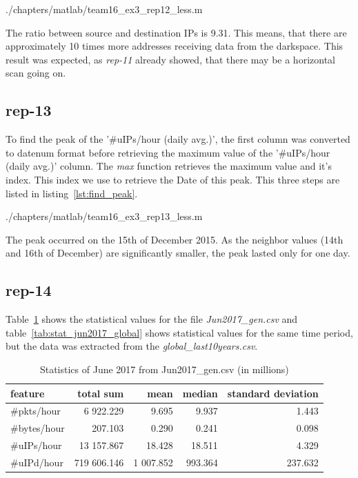 
				{./chapters/matlab/team16_ex3_rep12_less.m}


The ratio between source and destination IPs is 9.31. This means, that there are approximately 10 times more addresses receiving data from the darkspace. This result was expected, as \textit{rep-11} already showed, that there may be a horizontal scan going on.

\subsection*{rep-13}
To find the peak of the '\#uIPs/hour (daily avg.)', the first column was converted to datenum format before retrieving the maximum value of the '\#uIPs/hour (daily avg.)' column. The \textit{max} function retrieves the maximum value and it's index. This index we use to retrieve the Date of this peak. This three steps are listed in listing~\ref{lst:find_peak}.



				{./chapters/matlab/team16_ex3_rep13_less.m}


The peak occurred on the 15th of December 2015. As the neighbor values (14th and 16th of December) are significantly smaller, the peak lasted only for one day.

\subsection*{rep-14}
Table~\ref{tab:stat_jun2017_gen} shows the statistical values for the file \textit{Jun2017\_gen.csv} and table~\ref{tab:stat_jun2017_global} shows statistical values for the same time period, but the data was extracted from the \textit{global\_last10years.csv}. 

\begin{table}[H]
\center
\begin{tabular}{lrrrr}
\toprule
feature & total sum & mean & median & standard deviation \\
\midrule
\#pkts/hour & 6 922.229  &   9.695  &    9.937  &   1.443 \\
\#bytes/hour & 207.103  &   0.290   &   0.241  &   0.098 \\
\#uIPs/hour  & 13 157.867  &  18.428  &   18.511 &    4.329 \\
\#uIPd/hour  & 719 606.146 &  1 007.852 &   993.364 &  237.632 \\
\bottomrule
\end{tabular}
\caption{Statistics of June 2017 from Jun2017\_gen.csv (in millions)}
\label{tab:stat_jun2017_gen}
\end{table}

